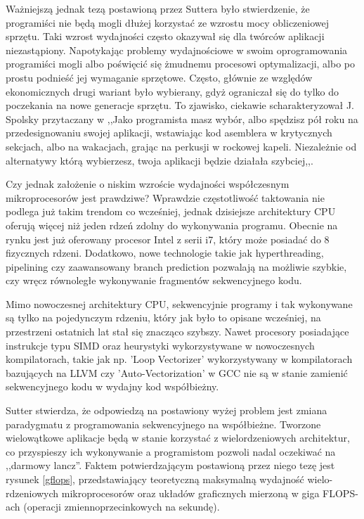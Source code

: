 Ważniejszą jednak tezą postawioną przez Suttera było stwierdzenie, że
programiści nie będą mogli dłużej korzystać ze wzrostu mocy obliczeniowej
sprzętu. Taki wzrost wydajności często okazywał się dla twórców aplikacji
niezastąpiony. Napotykając problemy wydajnościowe w swoim oprogramowania
programiści mogli albo poświęcić się żmudnemu procesowi optymalizacji, albo
po prostu podnieść jej wymaganie sprzętowe. Często, głównie ze względów
ekonomicznych drugi wariant było wybierany, gdyż ograniczał się do tylko do
poczekania na nowe generacje sprzętu. To zjawisko, ciekawie scharakteryzował J.
Spolsky przytaczany w \cite{nolunch} ,,Jako programista masz wybór, albo
spędzisz pół roku na przedesignowaniu swojej aplikacji, wstawiając kod asemblera
w krytycznych sekcjach, albo na wakacjach, grając na perkusji w rockowej kapeli.
Niezależnie od alternatywy którą wybierzesz, twoja aplikacji będzie działała
szybciej,,.

Czy jednak założenie o niskim wzroście wydajności współczesnym mikroprocesorów
jest prawdziwe? Wprawdzie częstotliwość taktowania nie podlega już takim trendom
co wcześniej, jednak dzisiejsze architektury CPU oferują więcej niż jeden rdzeń
zdolny do wykonywania programu. Obecnie na rynku jest już oferowany procesor
Intel z serii i7, który może posiadać do 8 fizycznych rdzeni. Dodatkowo, nowe
technologie takie jak hyperthreading, pipelining czy zaawansowany branch
prediction pozwalają na możliwie szybkie, czy wręcz równoległe wykonywanie
fragmentów sekwencyjnego kodu.

Mimo nowoczesnej architektury CPU, sekwencyjnie programy i tak wykonywane są
tylko na pojedynczym rdzeniu\cite{massive}, który jak było to opisane wcześniej,
na przestrzeni ostatnich lat stał się znacząco szybszy. Nawet 
procesory posiadające instrukcje typu SIMD oraz heurystyki wykorzystywane w
nowoczesnych kompilatorach, takie jak np. 'Loop Vectorizer' wykorzystywany w
kompilatorach bazujących na LLVM \cite{llvm} czy 'Auto-Vectorization' w GCC
\cite{gcc} nie są w stanie zamienić sekwencyjnego kodu w wydajny kod
współbieżny.

Sutter stwierdza, że odpowiedzą na postawiony wyżej problem jest zmiana
paradygmatu z programowania sekwencyjnego na współbieżne. Tworzone wielowątkowe
aplikacje będą w stanie korzystać z wielordzeniowych architektur, co przyspieszy
ich wykonywanie a programistom pozwoli nadal oczekiwać na ,,darmowy lancz''.
Faktem potwierdzającym postawioną przez niego tezę jest rysunek \ref{gflops},
przedstawiający teoretyczną maksymalną wydajność wielo-rdzeniowych mikroprocesorów oraz układów
graficznych mierzoną w giga FLOPS-ach (operacji zmiennoprzecinkowych na
sekundę).

